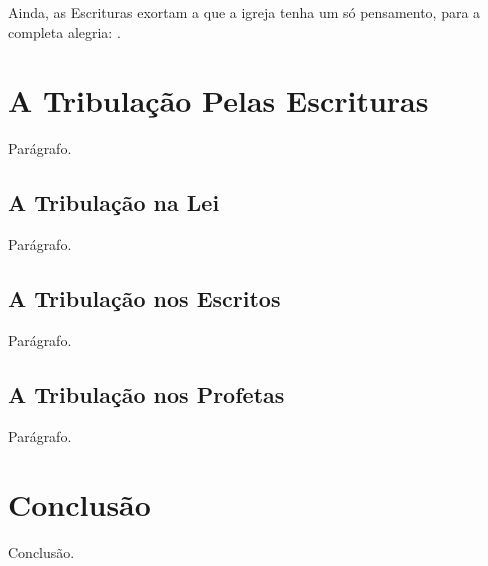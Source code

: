     Ainda, as Escrituras exortam a que a igreja tenha um só pensamento, para a completa alegria: .



\section{A Tribulação Pelas Escrituras}

    Parágrafo.

\subsection{A Tribulação na Lei}

    Parágrafo.

\subsection{A Tribulação nos Escritos}

    Parágrafo.

\subsection{A Tribulação nos Profetas}

    Parágrafo.



\section{Conclusão}

    Conclusão.


